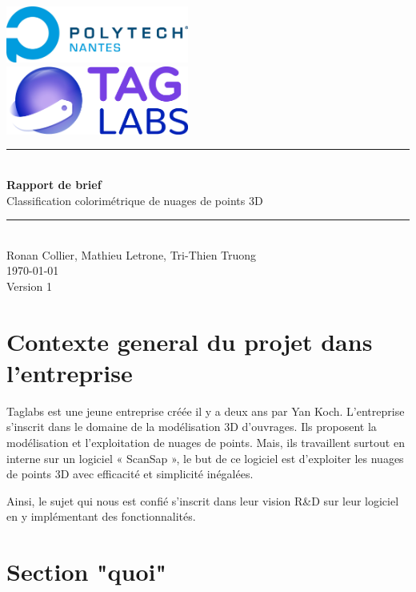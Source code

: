 \documentclass[12pt,titlepage,french]{article}
\begin{document}

\begin{titlepage}
\newcommand{\HRule}{\rule{\linewidth}{0.5mm}}
\center

  \includegraphics[width=0.45\textwidth]{./image2.png}\\[1cm]
   
  \includegraphics[width=0.45\textwidth]{./image1.png}


\HRule \\[0.4cm]
{ \huge \bfseries Rapport de brief \\[0.15cm] }
Classification colorimétrique de nuages de points 3D
\HRule \\[1.5cm]
Ronan Collier,
Mathieu Letrone,
Tri-Thien Truong
\\[1cm]
\today \\ [1cm]
Version 1
\end{titlepage}

\section{Contexte general du projet dans l'entreprise}

Taglabs est une jeune entreprise créée il y a deux ans par Yan Koch. L'entreprise s'inscrit dans le domaine de la modélisation 3D d'ouvrages. Ils proposent la modélisation et l'exploitation de nuages de points. Mais, ils travaillent surtout en interne sur un logiciel « ScanSap », le but de ce logiciel est d'exploiter les nuages de points 3D avec efficacité et simplicité inégalées.

Ainsi, le sujet qui nous est confié s'inscrit dans leur vision R\&D sur leur logiciel en y implémentant des fonctionnalités.


\section{Section "quoi"}
\end{document}
